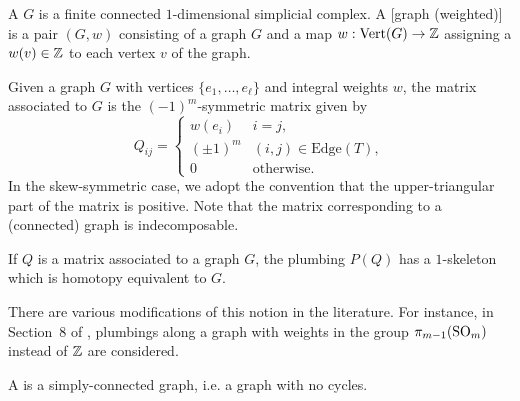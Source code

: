\begin{definition}
	A  $G$ is a finite connected $1$-dimensional simplicial complex.
	A [graph (weighted)] is a pair $(G,w)$ consisting of a graph $G$ and a map $w : \operatorname{Vert}(G) \to \mathbb{Z}$ assigning a  $w(v)\in \mathbb{Z}$ to each vertex $v$ of the graph.
\end{definition}

Given a graph $G$ with vertices $\{e_1,\ldots, e_\ell\}$ and integral weights $w$, the matrix associated to $G$ is the $(-1)^m$-symmetric matrix given by
\[
	Q_{ij} = \begin{cases}
		w(e_i)    & i=j,                       \\
		(\pm 1)^m & (i,j)\in \textrm{Edge}(T), \\
		0         & \textrm{otherwise}.
	\end{cases}
\]
In the skew-symmetric case, we adopt the convention that the upper-triangular part of the matrix is positive. Note that the matrix corresponding to a (connected) graph is indecomposable.

\begin{remark*}
	If $Q$ is a matrix associated to a graph $G$, the plumbing $P(Q)$ has a $1$-skeleton which is homotopy equivalent to $G$.
\end{remark*}

\begin{remark*}
	There are various modifications of this notion in the literature. For instance, in Section~8 of \cite{hirzebruch1971quadratic}, plumbings along a graph with weights in the group $\pi_{m-1}(\mathrm{SO}_m)$ instead of $\mathbb{Z}$ are considered.
\end{remark*}


\begin{definition}
	A  is a simply-connected graph, i.e. a graph with no cycles.
\end{definition}

